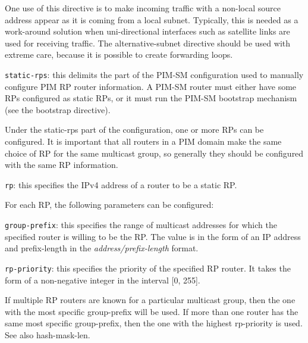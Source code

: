 \begin{description}
\begin{description}
  One use of this directive is to make incoming traffic with a
  non-local source address appear as it is coming from a local
  subnet. Typically, this is needed as a work-around solution when
  uni-directional interfaces such as satellite links are used for
  receiving traffic.  The {\stt alternative-subnet} directive should be
  used with extreme care, because it is possible to create forwarding
  loops.
\end{description}
\item{\tt static-rps}: this delimits the part of the PIM-SM
  configuration used to manually configure PIM RP router information.
  A PIM-SM router must either have some RPs configured as static RPs,
  or it must run the PIM-SM bootstrap mechanism (see the {\stt
  bootstrap} directive).  

  Under the {\stt static-rps} part of the configuration, one or more
  RPs can be configured.  It is important that all routers in a PIM
  domain make the same choice of RP for the same multicast group, so
  generally they should be configured with the same RP information.
\begin{description}
\item{\tt rp}: this specifies the IPv4 address of a router to be a
  static RP.  

  For each RP, the following parameters can be configured:
\begin{description}
\item{\tt group-prefix}: this specifies the range of multicast
  addresses for which the specified router is willing to be the RP.
  The value is in the form of an IP address and prefix-length in the
  {\it address/prefix-length} format.
\begin{description}
\item{\tt rp-priority}: this specifies the priority of the specified
  RP router.  It takes the form of a non-negative integer in the
  interval [0, 255].

  If multiple RP routers are known for a particular multicast group,
  then the one with the most specific {\stt group-prefix} will be
  used.  If more than one router has the same most specific {\stt
  group-prefix}, then the one with the highest {\stt rp-priority} is
  used.  See also {\stt hash-mask-len}.


\end{description}
\end{description}
\end{description}
\end{description}
